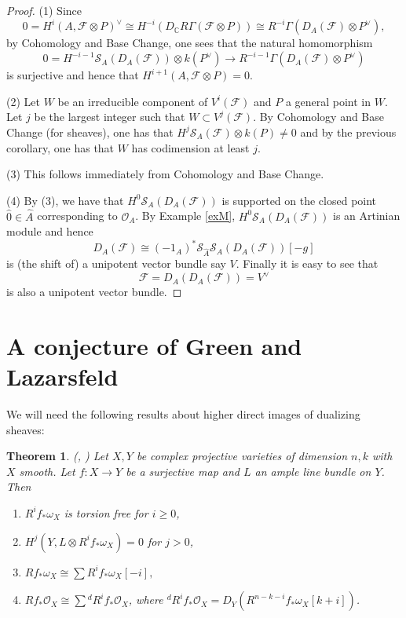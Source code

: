 \documentclass[10pt]{amsart}
\newtheorem{thm}{Theorem}[section]
\newcommand\lra{\longrightarrow}
\newcommand\ot{{\otimes}}
\newcommand\OO{{\mathcal{O}}}
\newcommand\FF{{\mathcal{F}}}
\newcommand\CC{{\mathbb{C}}}
\newcommand\s{{ {\mathcal S}}}
\begin{document}
 \begin{proof} 
 (1) Since
$$0=H^i(A,\FF \ot P)^\vee \cong H^{-i}(D_\CC R
 \Gamma (\FF \ot P))\cong R^{-i}\Gamma (D_A(\FF )\ot P^\vee ),$$
by Cohomology and Base Change, one sees that the natural
homomorphism
$$0=H^{-i-1}\s _A (D_A(\FF ))\ot k(P^\vee)
\lra R^{-i-1}\Gamma (D_A(\FF)\ot P^\vee)
$$ 
is surjective and hence that $H^{i+1}(A,\FF \ot P)=0$.

(2) Let $W$ be an irreducible component of $V^i(\FF)$ and $P$ 
a general point in
 $W$.
 Let $j$ be the largest integer such that $W\subset V^j(\FF )$.
By Cohomology and Base Change (for sheaves), one 
has that $H^j\s _A (\FF )\ot k(P)
\ne 0$
and by the previous corollary, one has that $W$ has codimension at least $j$.

 (3) This follows immediately from Cohomology and Base Change.

 (4) By (3), we have that $H^0\s _A (D_A(\FF ))$ is supported on 
 the closed point $\hat{0}\in \hat {A}$ corresponding to $\OO _A$.
 By Example \ref{exM}, $H^0 \s _A (D_A(\FF ))$ is an Artinian
 module and hence
 $$D_A(\FF )\cong (-1_A)^* \s _{\hat {A}}  \s _A (D_A (\FF ))[-g]$$
 is (the shift of) a unipotent vector bundle say $V$. Finally it is easy to see
 that $$\FF=D_A(D_A(\FF))=V^\vee$$ is also a unipotent vector bundle.
 \end{proof}

\newpage
\section{\label{GL}A conjecture of Green and Lazarsfeld}

We will need the following results about higher direct images of dualizing
sheaves:

 \begin{thm} \label{kollar} {(\cite {Ko1}, \cite{Ko2})}
 Let $X,Y$ be complex projective varieties of dimension $n,k$
 with $X$ smooth.
 Let $f:X\lra Y$ be a surjective map and $L$ an ample line bundle on $Y$. Then
 \begin{enumerate}
 \item $R^if_* \omega _X $ is torsion free for $i\geq 0$,
 \item $H^j(Y,L\ot R^if_*\omega _X )=0$ for $j>0$,
 \item $R f_* \omega _X \cong \sum R^if_* \omega _X [-i],$
 \item $R f_* \OO _X \cong \sum {}^dR^if_* \OO _X$, where 
 ${}^dR^if_* \OO _X=D_Y(R^{n-k-i}f_* \omega _X [k+i])$.
 \end{enumerate}
 \end{thm}
 
\end{document}
